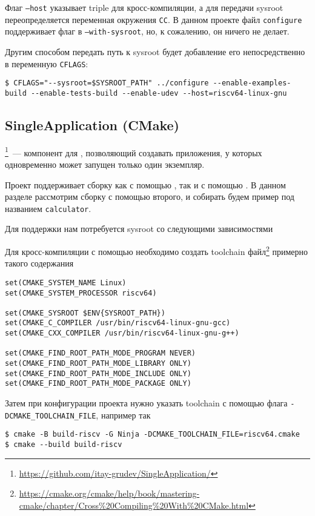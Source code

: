 Флаг \texttt{--host} указывает triple для кросс-компиляции, а для передачи sysroot переопределяется переменная окружения \texttt{CC}.
В данном проекте файл \texttt{configure} поддерживает флаг в \texttt{--with-sysroot}, но, к сожалению, он ничего не делает.

Другим способом передать путь к sysroot будет добавление его непосредственно в переменную \texttt{CFLAGS}:
\begin{verbatim}
$ CFLAGS="--sysroot=$SYSROOT_PATH" ../configure --enable-examples-build --enable-tests-build --enable-udev --host=riscv64-linux-gnu
\end{verbatim}

\subsection{SingleApplication (CMake)}

\singleapp{}\footnote{\url{https://github.com/itay-grudev/SingleApplication/}}~--- компонент для \qt{}, позволяющий создавать приложения, у которых одновременно может запущен только один экземпляр.

Проект поддерживает сборку как с помощью \qmake{}, так и с помощью \cmake{}.
В данном разделе рассмотрим сборку с помощью второго, и собирать будем пример под названием \texttt{calculator}.

Для поддержки \qt{} нам потребуется sysroot со следующими зависимостями 

Для кросс-компиляции с помощью \cmake{} необходимо создать toolchain файл\footnote{\url{https://cmake.org/cmake/help/book/mastering-cmake/chapter/Cross\%20Compiling\%20With\%20CMake.html}} примерно такого содержания

\begin{verbatim}
set(CMAKE_SYSTEM_NAME Linux)
set(CMAKE_SYSTEM_PROCESSOR riscv64)

set(CMAKE_SYSROOT $ENV{SYSROOT_PATH})
set(CMAKE_C_COMPILER /usr/bin/riscv64-linux-gnu-gcc)
set(CMAKE_CXX_COMPILER /usr/bin/riscv64-linux-gnu-g++)

set(CMAKE_FIND_ROOT_PATH_MODE_PROGRAM NEVER)
set(CMAKE_FIND_ROOT_PATH_MODE_LIBRARY ONLY)
set(CMAKE_FIND_ROOT_PATH_MODE_INCLUDE ONLY)
set(CMAKE_FIND_ROOT_PATH_MODE_PACKAGE ONLY)
\end{verbatim}

Затем при конфигурации проекта нужно указать toolchain с помощью флага \texttt{-DCMAKE\_TOOLCHAIN\_FILE}, например так
\begin{verbatim}
$ cmake -B build-riscv -G Ninja -DCMAKE_TOOLCHAIN_FILE=riscv64.cmake
$ cmake --build build-riscv
\end{verbatim}

